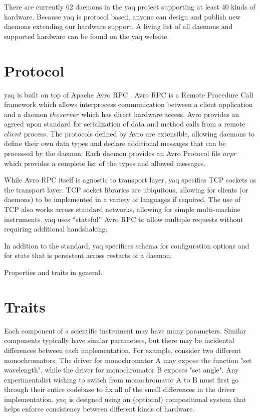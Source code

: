 \documentclass{article}
\begin{document}
There are currently 62 daemons in the yaq project supporting at least 40 kinds of hardware.
Because yaq is protocol based, anyone can design and publish new daemons extending our hardware support.
A living list of all daemons and supported hardware can be found on the yaq website.

\section{Protocol}

yaq is built on top of Apache Avro RPC \cite{AvroSpecification}.
Avro RPC is a Remote Procedure Call framework which allows interprocess communication between a client application and a daemon \(the server\) which has direct hardware access.
Avro provides an agreed upon standard for serialization of data and method calls from a remote \(client\) process.
The protocols defined by Avro are extensible, allowing daemons to define their own data types and declare additional messages that can be processed by the daemon.
Each daemon provides an Avro Protocol file \(avpr\) which provides a complete list of the types and allowed messages.

While Avro RPC itself is agnostic to transport layer, yaq specifies TCP sockets as the transport layer.
TCP socket libraries are ubiquitous, allowing for clients (or daemons) to be implemented in a variety of languages if required.
The use of TCP also works across standard networks, allowing for simple multi-machine instruments.
yaq uses ``stateful'' Avro RPC to allow multiple requests without requiring additional handshaking.

In addition to the standard, yaq specifices schema for configuration options and for state that is persistent across restarts of a daemon.

Properties and traits in general.

\section{Traits}

Each component of a scientific instrument may have many parameters.
Similar components typically have similar parameters, but there may be incidental differences between each implementation.
For example, consider two different monochromators.
The driver for monochromator A may expose the function "set wavelength", while the driver for monochromator B exposes "set angle".
Any experimentalist wishing to switch from monochromator A to B must first go through their entire codebase to fix all of the small differences in the driver implementation.
yaq is designed using an (optional) compositional system that helps enforce consistency between different kinds of hardware.
\end{document}
